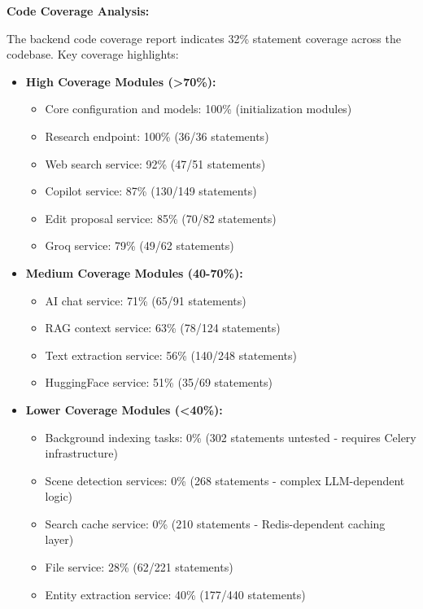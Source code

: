 \textbf{Code Coverage Analysis:}

The backend code coverage report indicates 32\% statement coverage across the codebase. Key coverage highlights:

\begin{itemize}
    \item \textbf{High Coverage Modules (>70\%):}
    \begin{itemize}
        \item Core configuration and models: 100\% (initialization modules)
        \item Research endpoint: 100\% (36/36 statements)
        \item Web search service: 92\% (47/51 statements)
        \item Copilot service: 87\% (130/149 statements)
        \item Edit proposal service: 85\% (70/82 statements)
        \item Groq service: 79\% (49/62 statements)
    \end{itemize}
    \item \textbf{Medium Coverage Modules (40-70\%):}
    \begin{itemize}
        \item AI chat service: 71\% (65/91 statements)
        \item RAG context service: 63\% (78/124 statements)
        \item Text extraction service: 56\% (140/248 statements)
        \item HuggingFace service: 51\% (35/69 statements)
    \end{itemize}
    \item \textbf{Lower Coverage Modules (<40\%):}
    \begin{itemize}
        \item Background indexing tasks: 0\% (302 statements untested - requires Celery infrastructure)
        \item Scene detection services: 0\% (268 statements - complex LLM-dependent logic)
        \item Search cache service: 0\% (210 statements - Redis-dependent caching layer)
        \item File service: 28\% (62/221 statements)
        \item Entity extraction service: 40\% (177/440 statements)
    \end{itemize}
\end{itemize}

